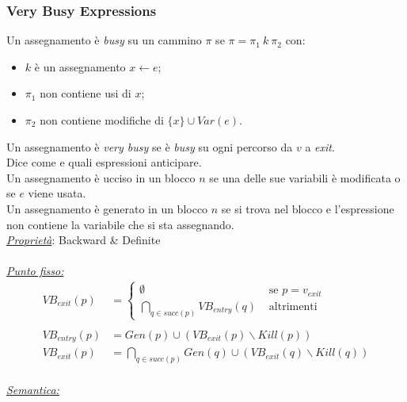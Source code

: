 \documentclass{article}
\begin{document}
            \subsubsection{Very Busy Expressions}
                Un assegnamento è \textit{busy} su un cammino $\pi$ se $\pi = \pi_1 ~k~ \pi_2$ con:
                \begin{itemize}
                    \item $k$ è un assegnamento $x\leftarrow e$;
                    \item $\pi_1$ non contiene usi di $x$;
                    \item $\pi_2$ non contiene modifiche di $\{x\}\cup Var(e)$.
                \end{itemize}
                Un assegnamento è \textit{very busy} se è \textit{busy} su ogni percorso da $v$ a \textit{exit}.\\
                Dice come e quali espressioni anticipare.\\
                Un assegnamento è ucciso in un blocco $n$ se una delle sue variabili è modificata o se $e$ viene usata.\\
                Un assegnamento è generato in un blocco $n$ se si trova nel blocco e l'espressione non contiene la variabile che si sta assegnando.\\
                \textit{\underline{Proprietà}}: Backward \& Definite\\
                \\
                \underline{\textit{Punto fisso:}}
                \begin{align*}
                    VB_{exit}(p) &= 
                    \begin{cases}
                        \emptyset &\text{ se } p = v_{exit} \\
                        \bigcap_{q\in succ(p)} VB_{entry}(q) &\text{ altrimenti}
                    \end{cases}\\ \\
                    VB_{entry}(p) &= Gen(p) \cup (VB_{exit}(p)\backslash Kill(p))\\
                    VB_{exit}(p) &= \bigcap_{q\in succ(p)} Gen(q) \cup (VB_{exit}(q)\backslash Kill(q))
                \end{align*}
                \\
                \underline{\textit{Semantica:}}
\end{document}
